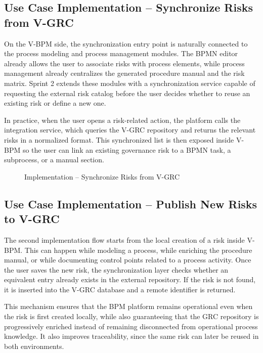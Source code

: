 \subsection{Use Case Implementation -- Synchronize Risks from V-GRC}

On the V-BPM side, the synchronization entry point is naturally connected to the process modeling and process management modules. The BPMN editor already allows the user to associate risks with process elements, while process management already centralizes the generated procedure manual and the risk matrix. Sprint 2 extends these modules with a synchronization service capable of requesting the external risk catalog before the user decides whether to reuse an existing risk or define a new one.

In practice, when the user opens a risk-related action, the platform calls the integration service, which queries the V-GRC repository and returns the relevant risks in a normalized format. This synchronized list is then exposed inside V-BPM so the user can link an existing governance risk to a BPMN task, a subprocess, or a manual section.

\begin{figure}[H]
\centering
{}
\caption{Implementation -- Synchronize Risks from V-GRC}
\label{fig:impl-grc-fetch}
\end{figure}

\subsection{Use Case Implementation -- Publish New Risks to V-GRC}

The second implementation flow starts from the local creation of a risk inside V-BPM. This can happen while modeling a process, while enriching the procedure manual, or while documenting control points related to a process activity. Once the user saves the new risk, the synchronization layer checks whether an equivalent entry already exists in the external repository. If the risk is not found, it is inserted into the V-GRC database and a remote identifier is returned.

This mechanism ensures that the BPM platform remains operational even when the risk is first created locally, while also guaranteeing that the GRC repository is progressively enriched instead of remaining disconnected from operational process knowledge. It also improves traceability, since the same risk can later be reused in both environments.

